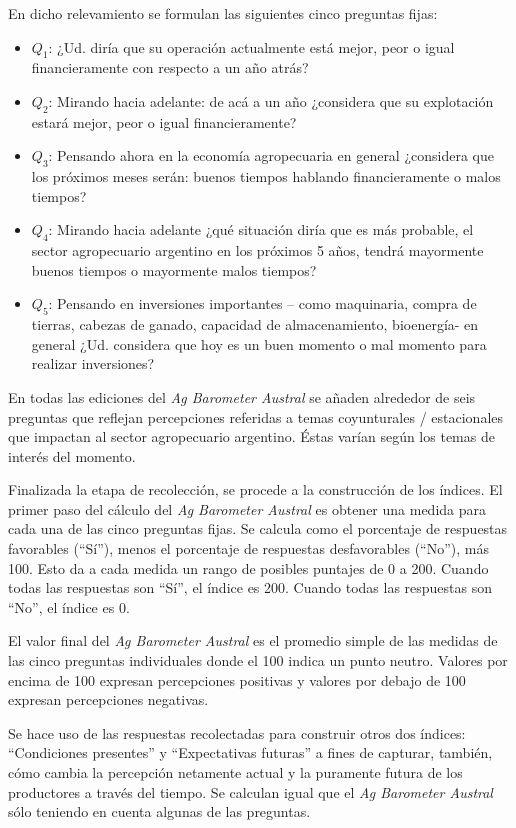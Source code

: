 \documentclass[12pt]{article}
\providecommand{\tightlist}{%
  \setlength{\itemsep}{0pt}\setlength{\parskip}{0pt}}\usepackage{longtable,booktabs,array}
\begin{document}
En dicho relevamiento se formulan las siguientes cinco preguntas fijas:

\begin{itemize}
\tightlist
\item
  \(Q_1\): ¿Ud. diría que su operación actualmente está mejor, peor o
  igual financieramente con respecto a un año atrás?
\item
  \(Q_2\): Mirando hacia adelante: de acá a un año ¿considera que su
  explotación estará mejor, peor o igual financieramente?
\item
  \(Q_3\): Pensando ahora en la economía agropecuaria en general
  ¿considera que los próximos meses serán: buenos tiempos hablando
  financieramente o malos tiempos?
\item
  \(Q_4\): Mirando hacia adelante ¿qué situación diría que es más
  probable, el sector agropecuario argentino en los próximos 5 años,
  tendrá mayormente buenos tiempos o mayormente malos tiempos?
\item
  \(Q_5\): Pensando en inversiones importantes -- como maquinaria,
  compra de tierras, cabezas de ganado, capacidad de almacenamiento,
  bioenergía- en general ¿Ud. considera que hoy es un buen momento o mal
  momento para realizar inversiones?
\end{itemize}

En todas las ediciones del \emph{Ag Barometer Austral} se añaden
alrededor de seis preguntas que reflejan percepciones referidas a temas
coyunturales / estacionales que impactan al sector agropecuario
argentino. Éstas varían según los temas de interés del momento.

Finalizada la etapa de recolección, se procede a la construcción de los
índices. El primer paso del cálculo del \emph{Ag Barometer Austral} es
obtener una medida para cada una de las cinco preguntas fijas. Se
calcula como el porcentaje de respuestas favorables (``Sí''), menos el
porcentaje de respuestas desfavorables (``No''), más 100. Esto da a cada
medida un rango de posibles puntajes de 0 a 200. Cuando todas las
respuestas son ``Sí'', el índice es 200. Cuando todas las respuestas son
``No'', el índice es 0.

El valor final del \emph{Ag Barometer Austral} es el promedio simple de
las medidas de las cinco preguntas individuales donde el 100 indica un
punto neutro. Valores por encima de 100 expresan percepciones positivas
y valores por debajo de 100 expresan percepciones negativas.

Se hace uso de las respuestas recolectadas para construir otros dos
índices: ``Condiciones presentes'' y ``Expectativas futuras'' a fines de
capturar, también, cómo cambia la percepción netamente actual y la
puramente futura de los productores a través del tiempo. Se calculan
igual que el \emph{Ag Barometer Austral} sólo teniendo en cuenta algunas
de las preguntas.
\end{document}
